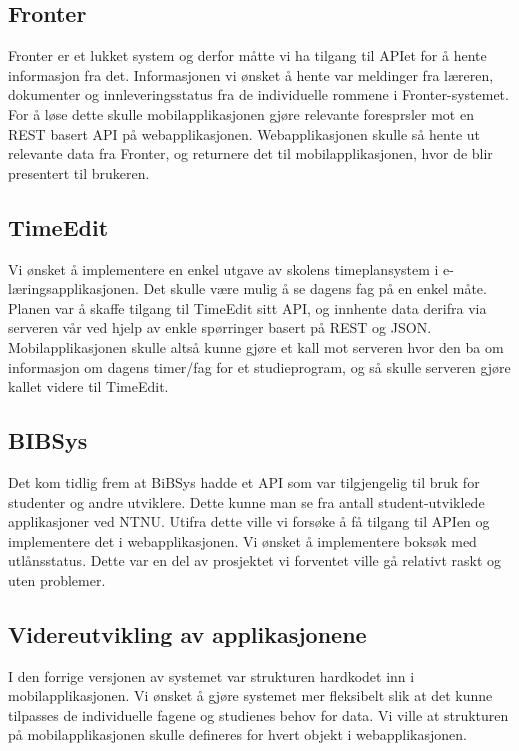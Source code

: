 \documentclass[../main.tex]{subfiles}
\begin{document}
\subsection{Fronter}
Fronter er et lukket system og derfor måtte vi ha tilgang til APIet for å hente informasjon fra det. Informasjonen vi ønsket å hente var meldinger fra læreren, dokumenter og innleveringsstatus fra de individuelle rommene i Fronter-systemet. For å løse dette skulle mobilapplikasjonen gjøre relevante foresprsler mot en REST basert API på webapplikasjonen. Webapplikasjonen skulle så hente ut relevante data fra Fronter, og returnere det til mobilapplikasjonen, hvor de blir presentert til brukeren.
\subsection{TimeEdit}
Vi ønsket å implementere en enkel utgave av skolens timeplansystem i e-læringsapplikasjonen. Det skulle være mulig å se dagens fag på en enkel måte. Planen var å skaffe tilgang til TimeEdit sitt API, og innhente data derifra via serveren vår ved hjelp av enkle spørringer basert på REST og JSON. Mobilapplikasjonen skulle altså kunne gjøre et kall mot serveren hvor den ba om informasjon om dagens timer/fag for et studieprogram, og så skulle serveren gjøre kallet videre til TimeEdit.
\subsection{BIBSys}
Det kom tidlig frem at BiBSys hadde et API som var tilgjengelig til bruk for studenter og andre utviklere. Dette kunne man se fra antall student-utviklede applikasjoner ved NTNU. Utifra dette ville vi forsøke å få tilgang til APIen og implementere det i webapplikasjonen. Vi ønsket å implementere boksøk med utlånsstatus. Dette var en del av prosjektet vi forventet ville gå relativt raskt og uten problemer.

\subsection{Videreutvikling av applikasjonene}
I den forrige versjonen av systemet var strukturen hardkodet inn i mobilapplikasjonen. Vi ønsket å gjøre systemet mer fleksibelt slik at det kunne tilpasses de individuelle fagene og studienes behov for data. Vi ville at strukturen på mobilapplikasjonen skulle defineres for hvert objekt i webapplikasjonen.
\end{document}
